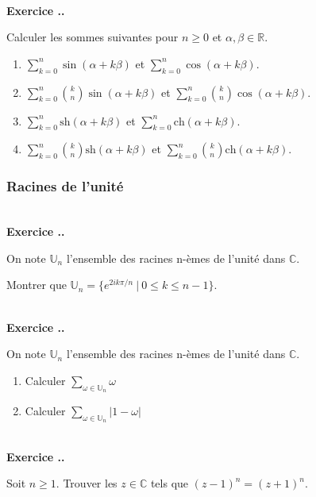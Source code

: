 \documentclass{article}
\newcommand{\mb}[1]{\mathbb{#1}}
\newcounter{exo}
\newcommand{\exercice}[1][\null]{\textbf{\\ Exercice \thesection.\theexo. #1} \addtocounter{exo}{1}}
\begin{document}
\exercice Calculer les sommes suivantes pour $n \ge 0$ et $\alpha, \beta \in \mb{R}$.

\begin{enumerate}

\item $\displaystyle \sum_{k=0}^n \sin(\alpha + k\beta)$ et $\displaystyle \sum_{k=0}^n \cos(\alpha + k\beta)$. 

\item $\displaystyle \sum_{k=0}^n {k \choose n} \sin(\alpha + k\beta)$ et $\displaystyle \sum_{k=0}^n {k \choose n} \cos(\alpha + k\beta)$.

\item $\displaystyle \sum_{k=0}^n \text{sh}(\alpha + k\beta)$ et $\displaystyle \sum_{k=0}^n \text{ch}(\alpha + k\beta)$. 

\item $\displaystyle \sum_{k=0}^n {k \choose n} \text{sh}(\alpha + k\beta)$ et $\displaystyle \sum_{k=0}^n {k \choose n} \text{ch}(\alpha + k\beta)$.

\end{enumerate}





\subsubsection{Racines de l'unité}



\exercice 
On note $\mathbb{U}_n$ l'ensemble des racines n-èmes de l'unité dans
$\mathbb{C}$.

Montrer que $\mathbb{U}_n = \{ e^{2ik\pi / n} ~|~ 0 \leq k \leq n - 1 \}$.



\exercice

On note $\mathbb{U}_n$ l'ensemble des racines n-èmes de l'unité dans
$\mathbb{C}$.
\begin{enumerate}
    \item Calculer $\sum_{ \omega \in \mathbb{U}_n} \omega$
    \item Calculer $\sum_{ \omega \in \mathbb{U}_n} | 1 - \omega |$
\end{enumerate}


\exercice

Soit $n \ge 1$. Trouver les $z \in \mb{C}$ tels que $(z-1)^n = (z+1)^n$.
\end{document}
